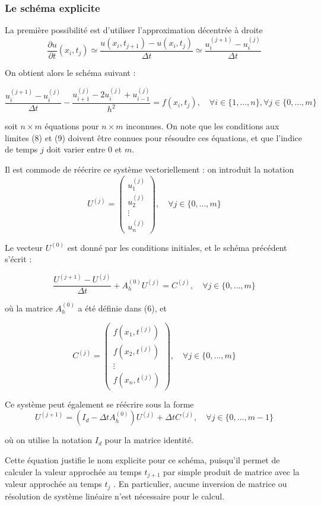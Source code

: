 \documentclass{beamer}
\begin{document}
  \begin{frame}    
  \frametitle{Le schéma explicite}
La première possibilité est d'utiliser l'approximation décentrée à droite
\[\frac{\partial u}{\partial t}(x_i,t_j) \simeq \frac{u(x_{i},t_{j+1})-u(x_{i},t_j)}{\Delta t}\simeq
\frac{u_{i}^{(j+1)}-u_{i}^{(j)} }{\Delta t}\]


On obtient alors le schéma suivant :

\[
\frac{u_{i}^{(j+1)}-u_{i}^{(j)} }{\Delta t} - \frac{u_{i+1}^{(j)}-2u_{i}^{(j)}+u_{i-1}^{(j)}}{h^2} = f(x_i,t_j), \quad \forall i\in\{1,...,n\} ,  \forall j\in\{0,...,m\} 
\]


soit $n \times m$ équations pour $n \times m$  inconnues. On note que les conditions aux limites (8) et (9) doivent être connues pour résoudre ces équations, et que l'indice de temps $j$ doit varier entre $0$ et $m$.

   \end{frame}
   \begin{frame}    
Il est commode de réécrire ce système vectoriellement : on introduit la notation
\[U^{(j)} =\left(\begin{array}{c}
u_1^{(j)}\\u_2^{(j)}\\ \vdots \\  u_n^{(j)}
\end{array}\right),\quad \forall j\in\{0,...,m\} \]

Le vecteur $U^{(0)}$ est donné par les conditions initiales, et le schéma précédent s'écrit :

   \begin{equation}
   \frac{U^{(j+1)}-U^{(j)} }{\Delta t} +A_h^{(0)}U^{(j)} =C^{(j)} , \quad \forall j\in\{0,...,m\} 
   \end{equation}

où la matrice $A_h^{(0)}$ a été définie dans (6), et

\[C^{(j)} =\left(\begin{array}{c}
f(x_1,t^{(j)})\\f(x_2,t^{(j)})\\ \vdots \\  f(x_n,t^{(j)})
\end{array}\right),\quad \forall j\in\{0,...,m\} \]
     \end{frame}
  
\begin{frame}      
 Ce système peut également se réécrire sous la forme
   \begin{equation}
  U^{(j+1)}=(I_d - \Delta t A_h^{(0)})U^{(j)}  +\Delta tC^{(j)} , \quad \forall j\in\{0,...,m-1\} 
   \end{equation}

où on utilise la notation $I_d$ pour la matrice identité.

Cette équation justifie le nom explicite pour ce schéma, puisqu'il permet
de calculer la valeur approchée au temps $t_{j+1}$ par simple produit de matrice avec la valeur approchée au temps $t_{j}$ . En particulier, aucune inversion de matrice ou résolution de système linéaire n'est nécessaire pour le calcul.

 \end{frame} 
  
\end{document}
